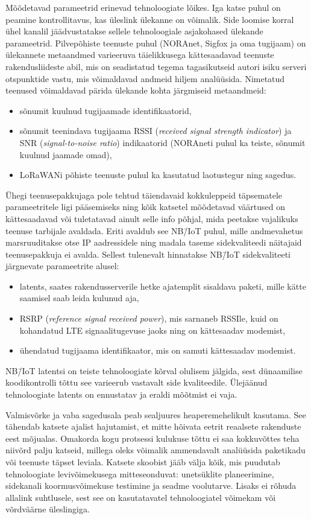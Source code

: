 \documentclass[12pt]{article}
\begin{document}
    Mõõdetavad parameetrid erinevad tehnoloogiate lõikes.
    Iga katse puhul on peamine kontrollitavus, kas üleslink ülekanne on võimalik.
    Side loomise korral ühel kanalil jäädvustatakse sellele tehnoloogiale asjakohased ülekande parameetrid.
    Pilvepõhiste teenuste puhul (NORAnet, Sigfox ja oma tugijaam) on ülekannete metaandmed varieeruva täielikkusega kättesaadavad teenuste rakendusliideste abil, mis on seadistatud tegema tagasikutseid autori isiku serveri otspunktide vastu, mis võimaldavad andmeid hiljem analüüsida.
    Nimetatud teenused võimaldavad pärida ülekande kohta järgmiseid metaandmeid:
    \begin{itemize}
        \item sõnumit kuulnud tugijaamade identifikaatorid,
        \item sõnumit teenindava tugijaama RSSI (\textit{received signal strength indicator}) ja SNR (\textit{signal-to-noise ratio}) indikaatorid (NORAneti puhul ka teiste, sõnumit kuulnud jaamade omad),
        \item LoRaWANi põhiste teenuste puhul ka kasutatud laotustegur ning sagedus.
    \end{itemize}
    Ühegi teenusepakkujaga pole tehtud täiendavaid kokkuleppeid täpsematele parameetritele ligi pääsemiseks ning kõik katsetel mõõdetavad väärtused on kättesaadavad või tuletatavad ainult selle info põhjal, mida peetakse vajalikuks teenuse tarbijale avaldada.
    Eriti avaldub see NB\=/IoT puhul, mille andmevahetus marsruuditakse otse IP aadressidele ning madala taseme sidekvaliteedi näitajaid teenusepakkuja ei avalda.
    Sellest tulenevalt hinnatakse NB\=/IoT sidekvaliteeti järgnevate parameetrite alusel:
    \begin{itemize}
        \item latents, saates rakendusserverile hetke ajatemplit sisaldava paketi, mille kätte saamisel saab leida kulunud aja,
        \item RSRP (\textit{reference signal received power}), mis sarnaneb RSSIle, kuid on kohandatud LTE signaalitugevuse jaoks ning on kättesaadav modemist,
        \item ühendatud tugijaama identifikaator, mis on samuti kättesaadav modemist.
    \end{itemize}
    NB\=/IoT latentsi on teiste tehnoloogiate kõrval olulisem jälgida, sest dünaamilise koodikontrolli tõttu see varieerub vastavalt side kvaliteedile.
    Ülejäänud tehnoloogiate latents on ennustatav ja eraldi mõõtmist ei vaja.

    Valmisvõrke ja vaba sagedusala peab sealjuures heaperemehelikult kasutama.
    See tähendab katsete ajalist hajutamist, et mitte hõivata eetrit reaalsete rakenduste eest mõjualas.
    Omakorda kogu protsessi kulukuse tõttu ei saa kokkuvõttes teha niivõrd palju katseid, millega oleks võimalik ammendavalt analüüsida paketikadu või teenuste täpset leviala.
    Katsete skoobist jääb välja kõik, mis puudutab tehnoloogiate levivõimekusega mitteseonduvat: unetsüklite planeerimine, sidekanali koormusvõimekuse testimine ja seadme voolutarve.
    Lisaks ei rõhuda allalink suhtlusele, sest see on kasutatavatel tehnoloogiatel võimekam või võrdväärne üleslingiga.
\end{document}
